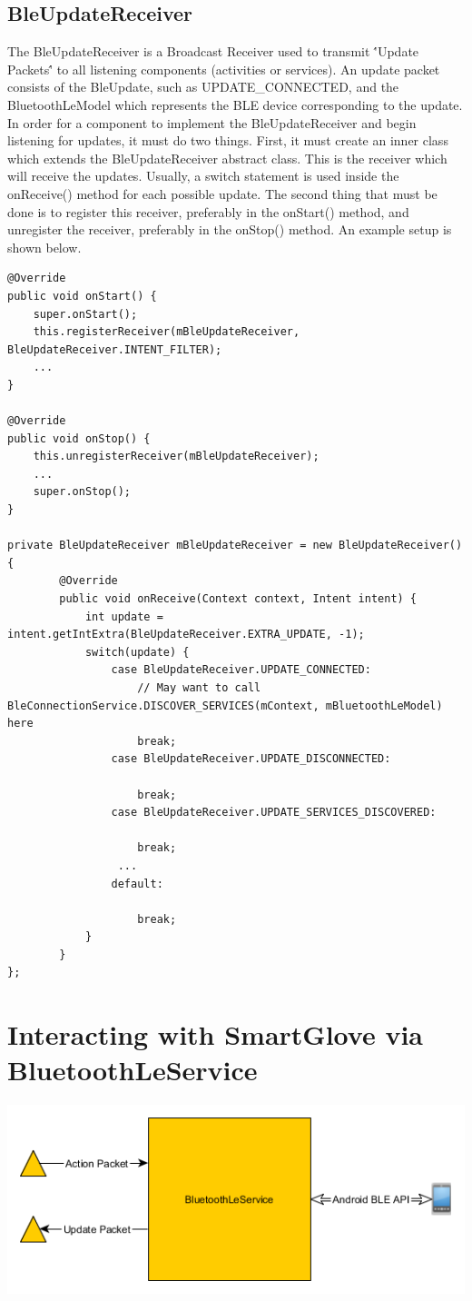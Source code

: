 \documentclass{scrreprt}
\begin{document}
\section{BleUpdateReceiver}
The BleUpdateReceiver is a Broadcast Receiver used to transmit \''Update Packets\'' to
all listening components (activities or services). An update packet consists of
the BleUpdate, such as UPDATE_CONNECTED, and the BluetoothLeModel which
represents the BLE device corresponding to the update. In order for a component
to implement the BleUpdateReceiver and begin listening for updates, it must do two things.
First, it must create an inner class which extends the BleUpdateReceiver abstract class.
This is the receiver which will receive the updates. Usually, a switch statement is used inside the
onReceive() method for each possible update. The second thing that must be done is to register
this receiver, preferably in the onStart() method, and unregister the receiver, preferably in the
onStop() method. An example setup is shown below.
\pagebreak
\begin{lstlisting}
@Override
public void onStart() {
	super.onStart();
	this.registerReceiver(mBleUpdateReceiver, BleUpdateReceiver.INTENT_FILTER);
	...
}

@Override
public void onStop() {
	this.unregisterReceiver(mBleUpdateReceiver);
	...
	super.onStop();
}

private BleUpdateReceiver mBleUpdateReceiver = new BleUpdateReceiver() {
        @Override
        public void onReceive(Context context, Intent intent) {
            int update = intent.getIntExtra(BleUpdateReceiver.EXTRA_UPDATE, -1);
            switch(update) {
                case BleUpdateReceiver.UPDATE_CONNECTED:
                    // May want to call BleConnectionService.DISCOVER_SERVICES(mContext, mBluetoothLeModel) here
                    break;
                case BleUpdateReceiver.UPDATE_DISCONNECTED:

                    break;
                case BleUpdateReceiver.UPDATE_SERVICES_DISCOVERED:
                   
                    break;
                 ...
                default:

                    break;
            }
        }
};
\end{lstlisting}


\chapter{Interacting with SmartGlove via BluetoothLeService}
\includegraphics[width=\textwidth]{BluetoothLeServiceOverview}
\end{document}
